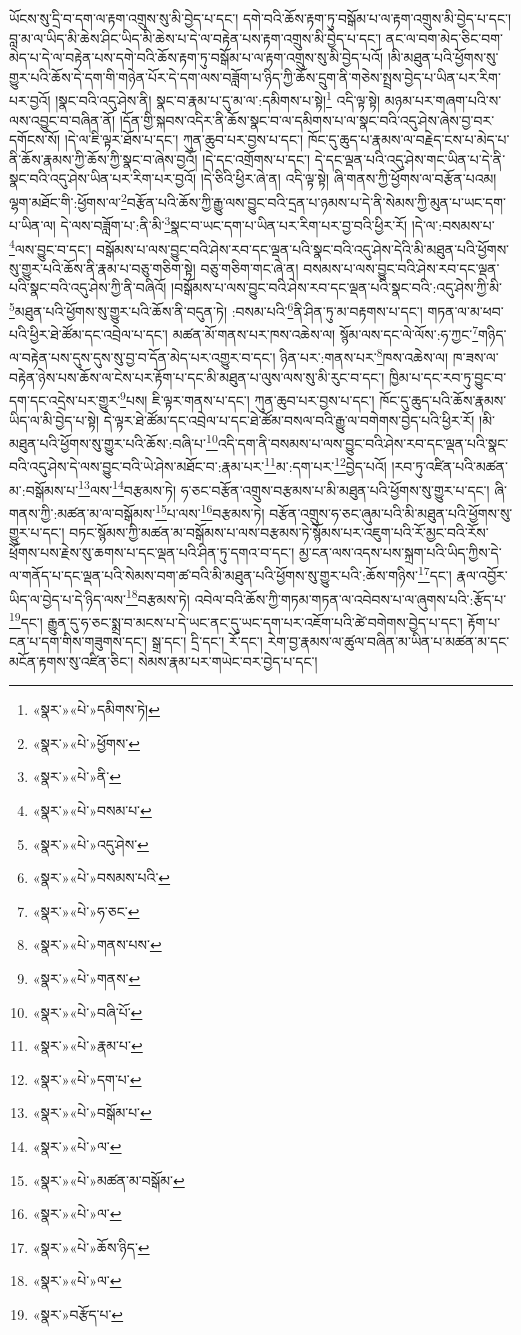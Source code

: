 ཡོངས་སུ་དྲི་བ་དག་ལ་རྟག་འགྲུས་སུ་མི་བྱེད་པ་དང་། དགེ་བའི་ཆོས་རྟག་ཏུ་བསྒོམ་པ་ལ་རྟག་འགྲུས་མི་བྱེད་པ་དང་། བླ་མ་ལ་ཡིད་མི་ཆེས་ཤིང་ཡིད་མི་ཆེས་པ་དེ་ལ་བརྟེན་པས་རྟག་འགྲུས་མི་བྱེད་པ་དང་། ནང་ལ་བག་མེད་ཅིང་བག་མེད་པ་དེ་ལ་བརྟེན་པས་དགེ་བའི་ཆོས་རྟག་ཏུ་བསྒོམ་པ་ལ་རྟག་འགྲུས་སུ་མི་བྱེད་པའོ། །མི་མཐུན་པའི་ཕྱོགས་སུ་གྱུར་པའི་ཆོས་དེ་དག་གི་གཉེན་པོར་དེ་དག་ལས་བཟློག་པ་ཉིད་ཀྱི་ཆོས་དྲུག་ནི་གཅེས་སྤྲས་བྱེད་པ་ཡིན་པར་རིག་པར་བྱའོ། །སྣང་བའི་འདུ་ཤེས་ནི། སྣང་བ་རྣམ་པ་དུ་མ་ལ་:དམིགས་པ་སྟེ།\footnote{«སྣར་»«པེ་»དམིགས་ཏེ།} འདི་ལྟ་སྟེ། མཉམ་པར་གཞག་པའི་ས་ལས་འབྱུང་བ་བཞིན་ནོ། །དོན་གྱི་སྐབས་འདིར་ནི་ཆོས་སྣང་བ་ལ་དམིགས་པ་ལ་སྣང་བའི་འདུ་ཤེས་ཞེས་བྱ་བར་དགོངས་སོ། །དེ་ལ་ཇི་ལྟར་ཐོས་པ་དང་། ཀུན་ཆུབ་པར་བྱས་པ་དང་། ཁོང་དུ་ཆུད་པ་རྣམས་ལ་བརྗེད་ངས་པ་མེད་པ་ནི་ཆོས་རྣམས་ཀྱི་ཆོས་ཀྱི་སྣང་བ་ཞེས་བྱའོ། །དེ་དང་འགྲོགས་པ་དང་། དེ་དང་ལྡན་པའི་འདུ་ཤེས་གང་ཡིན་པ་དེ་ནི་སྣང་བའི་འདུ་ཤེས་ཡིན་པར་རིག་པར་བྱའོ། །དེ་ཅིའི་ཕྱིར་ཞེ་ན། འདི་ལྟ་སྟེ། ཞི་གནས་ཀྱི་ཕྱོགས་ལ་བརྩོན་པའམ། ལྷག་མཐོང་གི་:ཕྱོགས་ལ་\footnote{«སྣར་»«པེ་»ཕྱོགས་}བརྩོན་པའི་ཆོས་ཀྱི་རྒྱུ་ལས་བྱུང་བའི་དྲན་པ་ཉམས་པ་དེ་ནི་སེམས་ཀྱི་མུན་པ་ཡང་དག་པ་ཡིན་ལ། དེ་ལས་བཟློག་པ་:ནི་མི་\footnote{«སྣར་»«པེ་»ནི་}སྣང་བ་ཡང་དག་པ་ཡིན་པར་རིག་པར་བྱ་བའི་ཕྱིར་རོ། །དེ་ལ་:བསམས་པ་\footnote{«སྣར་»«པེ་»བསམ་པ་}ལས་བྱུང་བ་དང་། བསྒོམས་པ་ལས་བྱུང་བའི་ཤེས་རབ་དང་ལྡན་པའི་སྣང་བའི་འདུ་ཤེས་དེའི་མི་མཐུན་པའི་ཕྱོགས་སུ་གྱུར་པའི་ཆོས་ནི་རྣམ་པ་བཅུ་གཅིག་སྟེ། བཅུ་གཅིག་གང་ཞེ་ན། བསམས་པ་ལས་བྱུང་བའི་ཤེས་རབ་དང་ལྡན་པའི་སྣང་བའི་འདུ་ཤེས་ཀྱི་ནི་བཞིའོ། །བསྒོམས་པ་ལས་བྱུང་བའི་ཤེས་རབ་དང་ལྡན་པའི་སྣང་བའི་:འདུ་ཤེས་ཀྱི་མི་\footnote{«སྣར་»«པེ་»འདུ་ཤེས་}མཐུན་པའི་ཕྱོགས་སུ་གྱུར་པའི་ཆོས་ནི་བདུན་ཏེ། :བསམ་པའི་\footnote{«སྣར་»«པེ་»བསམས་པའི་}ནི་ཤིན་ཏུ་མ་བརྟགས་པ་དང་། གཏན་ལ་མ་ཕབ་པའི་ཕྱིར་ཐེ་ཚོམ་དང་འབྲེལ་པ་དང་། མཚན་མོ་གནས་པར་ཁས་འཆེས་ལ། སྙོམ་ལས་དང་ལེ་ལོས་:ཧ་ཀྱང་\footnote{«སྣར་»«པེ་»ཧ་ཅང་}གཉིད་ལ་བརྟེན་པས་དུས་དུས་སུ་བྱ་བ་དོན་མེད་པར་འགྱུར་བ་དང་། ཉིན་པར་:གནས་པར་\footnote{«སྣར་»«པེ་»གནས་པས་}ཁས་འཆེས་ལ། ཁ་ཟས་ལ་བརྟེན་ཉེས་པས་ཆོས་ལ་ངེས་པར་རྟོག་པ་དང་མི་མཐུན་པ་ལུས་ལས་སུ་མི་རུང་བ་དང་། ཁྱིམ་པ་དང་རབ་ཏུ་བྱུང་བ་དག་དང་འདྲེས་པར་གྱུར་\footnote{«སྣར་»«པེ་»གནས་}པས། ཇི་ལྟར་གནས་པ་དང་། ཀུན་ཆུབ་པར་བྱས་པ་དང་། ཁོང་དུ་ཆུད་པའི་ཆོས་རྣམས་ཡིད་ལ་མི་བྱེད་པ་སྟེ། དེ་ལྟར་ཐེ་ཚོམ་དང་འབྲེལ་པ་དང་ཐེ་ཚོམ་བསལ་བའི་རྒྱུ་ལ་བགེགས་བྱེད་པའི་ཕྱིར་རོ། །མི་མཐུན་པའི་ཕྱོགས་སུ་གྱུར་པའི་ཆོས་:བཞི་པ་\footnote{«སྣར་»«པེ་»བཞི་པོ་}འདི་དག་ནི་བསམས་པ་ལས་བྱུང་བའི་ཤེས་རབ་དང་ལྡན་པའི་སྣང་བའི་འདུ་ཤེས་དེ་ལས་བྱུང་བའི་ཡེ་ཤེས་མཐོང་བ་:རྣམ་པར་\footnote{«སྣར་»«པེ་»རྣམ་པ་}མ་:དག་པར་\footnote{«སྣར་»«པེ་»དག་པ་}བྱེད་པའོ། །རབ་ཏུ་འཛིན་པའི་མཚན་མ་:བསྒོམས་པ་\footnote{«སྣར་»«པེ་»བསྒོམ་པ་}ལས་\footnote{«སྣར་»«པེ་»ལ་}བརྩམས་ཏེ། ཧ་ཅང་བརྩོན་འགྲུས་བརྩམས་པ་མི་མཐུན་པའི་ཕྱོགས་སུ་གྱུར་པ་དང་། ཞི་གནས་ཀྱི་:མཚན་མ་ལ་བསྒོམས་\footnote{«སྣར་»«པེ་»མཚན་མ་བསྒོམ་}པ་ལས་\footnote{«སྣར་»«པེ་»ལ་}བརྩམས་ཏེ། བརྩོན་འགྲུས་ཧ་ཅང་ཞུམ་པའི་མི་མཐུན་པའི་ཕྱོགས་སུ་གྱུར་པ་དང་། བཏང་སྙོམས་ཀྱི་མཚན་མ་བསྒོམས་པ་ལས་བརྩམས་ཏེ་སྙོམས་པར་འཇུག་པའི་རོ་མྱང་བའི་རོས་ཕྲོགས་པས་རྗེས་སུ་ཆགས་པ་དང་ལྡན་པའི་ཤིན་ཏུ་དགའ་བ་དང་། མྱ་ངན་ལས་འདས་པས་སྐྲག་པའི་ཡིད་ཀྱིས་དེ་ལ་གནོད་པ་དང་ལྡན་པའི་སེམས་བག་ཚ་བའི་མི་མཐུན་པའི་ཕྱོགས་སུ་གྱུར་པའི་:ཆོས་གཉིས་\footnote{«སྣར་»«པེ་»ཆོས་ཉིད་}དང་། རྣལ་འབྱོར་ཡིད་ལ་བྱེད་པ་དེ་ཉིད་ལས་\footnote{«སྣར་»«པེ་»ལ་}བརྩམས་ཏེ། འབེལ་བའི་ཆོས་ཀྱི་གཏམ་གཏན་ལ་འབེབས་པ་ལ་ཞུགས་པའི་:རྩོད་པ་\footnote{«སྣར་»བརྩོད་པ་}དང་། རྒྱུན་དུ་ཧ་ཅང་སྨྲ་བ་མངས་པ་དེ་ཡང་ནང་དུ་ཡང་དག་པར་འཇོག་པའི་ཚེ་བགེགས་བྱེད་པ་དང་། རྟོག་པ་ངན་པ་དག་གིས་གཟུགས་དང་། སྒྲ་དང་། དྲི་དང་། རོ་དང་། རེག་བྱ་རྣམས་ལ་ཚུལ་བཞིན་མ་ཡིན་པ་མཚན་མ་དང་མངོན་རྟགས་སུ་འཛིན་ཅིང་། སེམས་རྣམ་པར་གཡེང་བར་བྱེད་པ་དང་། 